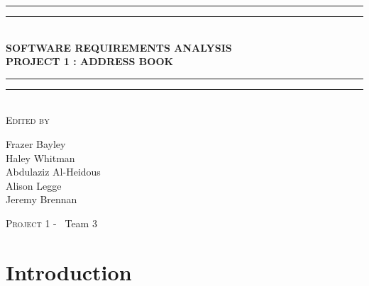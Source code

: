 \documentclass[a4paper, 11pt]{article}
\newlength{\drop}
\begin{document}
	
	\begin{titlepage}
		\textheight
		\centering
		\vspace*{\baselineskip}
		\rule{\textwidth}{1.6pt}\vspace*{-\baselineskip}\vspace*{2pt}
		\rule{\textwidth}{0.4pt}\\[\baselineskip]
		{\LARGE \textbf{SOFTWARE REQUIREMENTS ANALYSIS \\ PROJECT 1 : ADDRESS BOOK}}\\[0.2\baselineskip]
		\rule{\textwidth}{0.4pt}\vspace*{-\baselineskip}\vspace{3.2pt}
		\rule{\textwidth}{1.6pt}\\[\baselineskip]
		\scshape
		\vspace*{2\baselineskip}
		Edited by \\[\baselineskip]
		{\Large Frazer Bayley \\ Haley Whitman \\ Abdulaziz Al-Heidous \\ Alison Legge \\ Jeremy Brennan\par}

		\vfill
		{\scshape \LARGE Project 1 -} \        {\LARGE Team 3}\par
	\end{titlepage}


\tableofcontents
\vspace*{10\baselineskip}
\begin{versionhistory}
	
\end{versionhistory}
\pagebreak






\section{Introduction}
\end{document}
